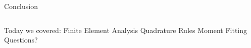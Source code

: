\begin{frame}{Conclusion}
\begin{columns}
\begin{center}
\begin{outline}
\1 Today we covered:
\2 Finite Element Analysis
\2 Quadrature Rules
\2 Moment Fitting
\1 Questions?
\end{outline}
\end{center}

\begin{center}
\end{center}

\end{columns}
\end{frame}
